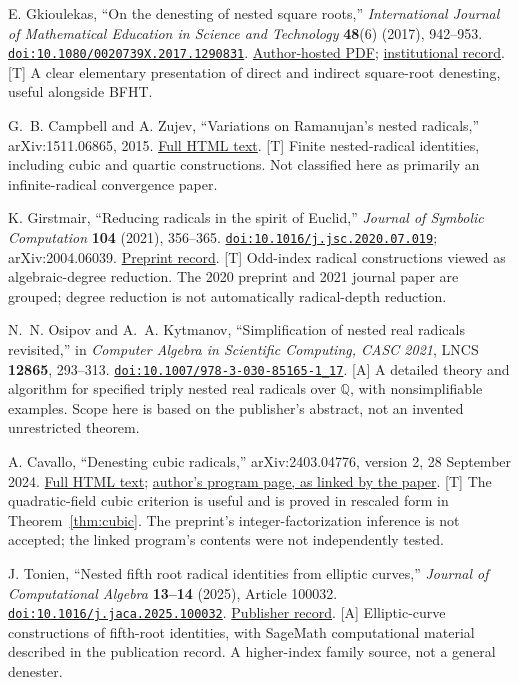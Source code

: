 \documentclass[11pt,a4paper]{article}
\numberwithin{equation}{section}
\theoremstyle{definition}\newtheorem{definition}[theorem]{Definition}
\theoremstyle{remark}\newtheorem{remark}[theorem]{Remark}
\newcommand{\Q}{\mathbb Q}\newcommand{\R}{\mathbb R}\newcommand{\C}{\mathbb C}\newcommand{\Z}{\mathbb Z}
\newcommand{\doi}[1]{\href{https://doi.org/#1}{\nolinkurl{doi:#1}}}
\newcommand{\access}[2]{\href{#1}{#2}}
\newcommand{\status}[1]{\textsf{\footnotesize[#1]}}
\begin{document}
\begin{thebibliography}{99}
 E. Gkioulekas, ``On the denesting of nested square roots,'' \emph{International Journal of Mathematical Education in Science and Technology} \textbf{48}(6) (2017), 942--953. \doi{10.1080/0020739X.2017.1290831}.
\access{https://faculty.utrgv.edu/eleftherios.gkioulekas/papers/024-denesting-square-roots.pdf}{Author-hosted PDF}; \access{https://scholarworks.utrgv.edu/mss_fac/243/}{institutional record}. \status{T}
A clear elementary presentation of direct and indirect square-root denesting, useful alongside BFHT.

 G.~B. Campbell and A. Zujev, ``Variations on Ramanujan's nested radicals,'' arXiv:1511.06865, 2015.
\access{https://arxiv.org/html/1511.06865v1}{Full HTML text}. \status{T}
Finite nested-radical identities, including cubic and quartic constructions. Not classified here as primarily an infinite-radical convergence paper.

 K. Girstmair, ``Reducing radicals in the spirit of Euclid,'' \emph{Journal of Symbolic Computation} \textbf{104} (2021), 356--365. \doi{10.1016/j.jsc.2020.07.019}; arXiv:2004.06039.
\access{https://arxiv.org/abs/2004.06039}{Preprint record}. \status{T}
Odd-index radical constructions viewed as algebraic-degree reduction. The 2020 preprint and 2021 journal paper are grouped; degree reduction is not automatically radical-depth reduction.

 N.~N. Osipov and A.~A. Kytmanov, ``Simplification of nested real radicals revisited,'' in \emph{Computer Algebra in Scientific Computing, CASC 2021}, LNCS \textbf{12865}, 293--313. \doi{10.1007/978-3-030-85165-1_17}. \status{A}
A detailed theory and algorithm for specified triply nested real radicals over $\Q$, with nonsimplifiable examples. Scope here is based on the publisher's abstract, not an invented unrestricted theorem.

 A. Cavallo, ``Denesting cubic radicals,'' arXiv:2403.04776, version 2, 28 September 2024.
\access{https://arxiv.org/html/2403.04776v2}{Full HTML text}; \access{https://sites.google.com/view/albertocavallomath/misc}{author's program page, as linked by the paper}. \status{T}
The quadratic-field cubic criterion is useful and is proved in rescaled form in Theorem~\ref{thm:cubic}. The preprint's integer-factorization inference is not accepted; the linked program's contents were not independently tested.

 J. Tonien, ``Nested fifth root radical identities from elliptic curves,'' \emph{Journal of Computational Algebra} \textbf{13--14} (2025), Article 100032. \doi{10.1016/j.jaca.2025.100032}.
\access{https://www.sciencedirect.com/science/article/pii/S2772827725000038}{Publisher record}. \status{A}
Elliptic-curve constructions of fifth-root identities, with SageMath computational material described in the publication record. A higher-index family source, not a general denester.


\end{thebibliography}
\end{document}
